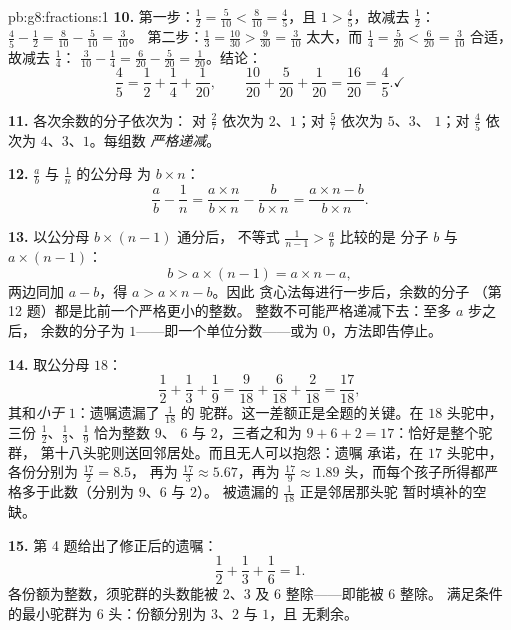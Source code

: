 \begin{solution}{pb:g8:fractions:1}
\textbf{10.} 第一步：$\frac12 = \frac{5}{10} < \frac{8}{10} =
\frac45$，且 $1 > \frac45$，故减去 $\frac12$：
$\frac45 - \frac12 = \frac{8}{10} - \frac{5}{10} = \frac{3}{10}$。
第二步：$\frac13 = \frac{10}{30} > \frac{9}{30} =
\frac{3}{10}$ 太大，而 $\frac14 = \frac{5}{20} <
\frac{6}{20} = \frac{3}{10}$ 合适，故减去 $\frac14$：
$\frac{3}{10} - \frac14 = \frac{6}{20} - \frac{5}{20} =
\frac{1}{20}$。结论：
\[
\frac45 = \frac12 + \frac14 + \frac{1}{20},
\qquad
\frac{10}{20} + \frac{5}{20} + \frac{1}{20} = \frac{16}{20}
= \frac45 . \checkmark
\]

\textbf{11.} 各次余数的分子依次为：
对 $\frac27$ 依次为 $2$、$1$；对 $\frac57$ 依次为 $5$、$3$、
$1$；对 $\frac45$ 依次为 $4$、$3$、$1$。每组数
\emph{严格递减}。

\textbf{12.} $\frac ab$ 与 $\frac1n$ 的公分母
为 $b \times n$：
\[
\frac{a}{b} - \frac{1}{n}
= \frac{a \times n}{b \times n} - \frac{b}{b \times n}
= \frac{a \times n - b}{b \times n} .
\]

\textbf{13.} 以公分母 $b \times (n-1)$ 通分后，
不等式 $\frac{1}{n-1} > \frac ab$ 比较的是
分子 $b$ 与 $a \times (n - 1)$：
\[
b > a \times (n - 1) = a \times n - a ,
\]
两边同加 $a - b$，得 $a > a \times n - b$。因此
贪心法每进行一步后，余数的分子
（第 12 题）都是比前一个严格更小的整数。
整数不可能严格递减下去：至多 $a$ 步之后，
余数的分子为 $1$——即一个单位分数——或为
$0$，方法即告停止。

\textbf{14.} 取公分母 $18$：
\[
\frac12 + \frac13 + \frac19
= \frac{9}{18} + \frac{6}{18} + \frac{2}{18}
= \frac{17}{18} ,
\]
其和\emph{小于} $1$：遗嘱遗漏了 $\frac{1}{18}$ 的
驼群。这一差额正是全题的关键。在 $18$ 头驼中，
三份 $\frac12$、$\frac13$、$\frac19$ 恰为整数 $9$、
$6$ 与 $2$，三者之和为 $9 + 6 + 2 = 17$：恰好是整个驼群，
第十八头驼则送回邻居处。而且无人可以抱怨：遗嘱
承诺，在 $17$ 头驼中，各份分别为 $\frac{17}{2} = 8.5$，
再为 $\frac{17}{3} \approx 5.67$，再为 $\frac{17}{9} \approx 1.89$
头，而每个孩子所得都严格多于此数（分别为 $9$、$6$ 与 $2$）。
被遗漏的 $\frac{1}{18}$ 正是邻居那头驼
暂时填补的空缺。

\textbf{15.} 第 4 题给出了修正后的遗嘱：
\[
\frac12 + \frac13 + \frac16 = 1 .
\]
各份额为整数，须驼群的头数能被
$2$、$3$ 及 $6$ 整除——即能被 $6$ 整除。
满足条件的最小驼群为 $6$ 头：份额分别为 $3$、$2$ 与 $1$，且
无剩余。
\end{solution}
